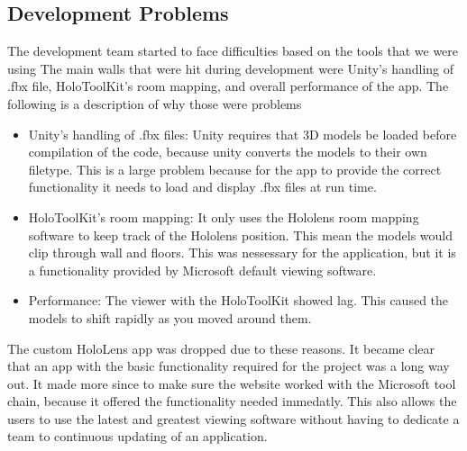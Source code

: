     \subsection{Development Problems}
    The development team started to face difficulties based on the tools that we were using
    The main walls that were hit during development were Unity's handling of .fbx file, HoloToolKit's room mapping, and overall performance of the app.
    The following is a description of why those were problems
    \begin{itemize}
        \item Unity's handling of .fbx files: Unity requires that 3D models be loaded before compilation of the code, because unity converts the models to their own filetype.
        This is a large problem because for the app to provide the correct functionality it needs to load and display .fbx files at run time.
        \item HoloToolKit's room mapping: It only uses the Hololens room mapping software to keep track of the Hololens position.
        This mean the models would clip through wall and floors. This was nessessary for the application, but it is a functionality provided by Microsoft default viewing software.
        \item Performance: The viewer with the HoloToolKit showed lag. This caused the models to shift rapidly as you moved around them. 
    \end{itemize}

    The custom HoloLens app was dropped due to these reasons. It became clear that an app with the basic functionality required for the project was a long way out.
    It made more since to make sure the website worked with the Microsoft tool chain, because it offered the functionality needed immedatly.
    This also allows the users to use the latest and greatest viewing software without having to dedicate a team to continuous updating of an application.



    

        
